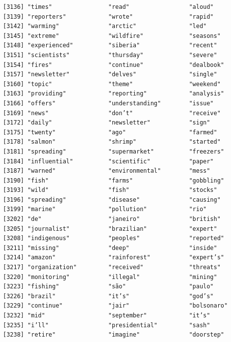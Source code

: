 \documentclass[
  letterpaper,
  DIV=11,
  numbers=noendperiod]{scrartcl}
\begin{document}
\begin{verbatim}
[3136] "times"                "read"                 "aloud"               
[3139] "reporters"            "wrote"                "rapid"               
[3142] "warming"              "arctic"               "led"                 
[3145] "extreme"              "wildfire"             "seasons"             
[3148] "experienced"          "siberia"              "recent"              
[3151] "scientists"           "thursday"             "severe"              
[3154] "fires"                "continue"             "dealbook"            
[3157] "newsletter"           "delves"               "single"              
[3160] "topic"                "theme"                "weekend"             
[3163] "providing"            "reporting"            "analysis"            
[3166] "offers"               "understanding"        "issue"               
[3169] "news"                 "don’t"                "receive"             
[3172] "daily"                "newsletter"           "sign"                
[3175] "twenty"               "ago"                  "farmed"              
[3178] "salmon"               "shrimp"               "started"             
[3181] "spreading"            "supermarket"          "freezers"            
[3184] "influential"          "scientific"           "paper"               
[3187] "warned"               "environmental"        "mess"                
[3190] "fish"                 "farms"                "gobbling"            
[3193] "wild"                 "fish"                 "stocks"              
[3196] "spreading"            "disease"              "causing"             
[3199] "marine"               "pollution"            "rio"                 
[3202] "de"                   "janeiro"              "british"             
[3205] "journalist"           "brazilian"            "expert"              
[3208] "indigenous"           "peoples"              "reported"            
[3211] "missing"              "deep"                 "inside"              
[3214] "amazon"               "rainforest"           "expert’s"            
[3217] "organization"         "received"             "threats"             
[3220] "monitoring"           "illegal"              "mining"              
[3223] "fishing"              "são"                  "paulo"               
[3226] "brazil"               "it’s"                 "god’s"               
[3229] "continue"             "jair"                 "bolsonaro"           
[3232] "mid"                  "september"            "it’s"                
[3235] "i’ll"                 "presidential"         "sash"                
[3238] "retire"               "imagine"              "doorstep"            

\end{verbatim}
\end{document}

